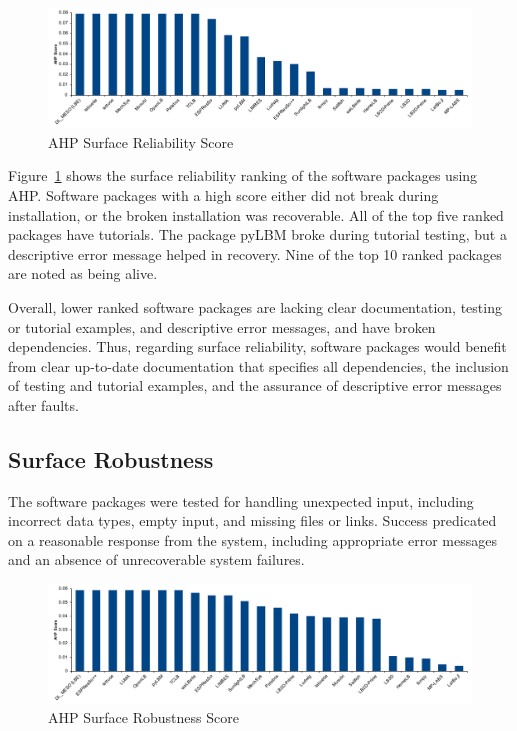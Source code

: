 \documentclass[final, 3p, times, authoryear]{elsarticle}
\begin{document}
\begin{figure}[h!]
	\begin{center}
		\includegraphics[width=1.0\textwidth]{./figures/reliability_chart.pdf}
		\caption{AHP Surface Reliability Score}
		\label{Fig_Reliability}
	\end{center}
\end{figure}

Figure~\ref{Fig_Reliability} shows the surface reliability ranking of the
software packages using AHP. Software packages with a high score either did not
break during installation, or the broken installation was recoverable. All of
the top five ranked packages have tutorials. The package pyLBM broke
during tutorial testing, but a descriptive error message helped in recovery.
Nine of the top 10 ranked packages are noted as being alive. 

Overall, lower ranked software packages are lacking clear documentation, testing
or tutorial examples, and descriptive error messages, and have broken
dependencies. Thus, regarding surface reliability, software packages would
benefit from clear up-to-date documentation that specifies all dependencies, the
inclusion of testing and tutorial examples, and the assurance of descriptive
error messages after faults.

\subsection{Surface Robustness}

The software packages were tested for handling unexpected input, including
incorrect data types, empty input, and missing files or links. Success
predicated on a reasonable response from the system, including appropriate error
messages and an absence of unrecoverable system failures. 

\begin{figure}[h!]
	\begin{center}
		\includegraphics[width=1.0\textwidth]{./figures/robustness_chart.pdf}
		\caption{AHP Surface Robustness Score}
		\label{Fig_Robustness}
	\end{center}
\end{figure}
\end{document}
